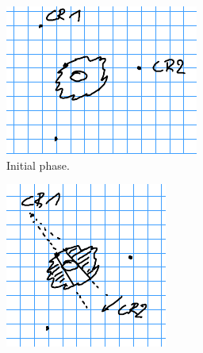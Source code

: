\begin{figure}[h!]
	\centering
	\begin{subfigure}[t]{0.3\linewidth}
		\centering
		\includegraphics[width=\linewidth]{graphics/triangle_1.png}
		\caption{Initial phase.}
		\label{fig:triangle_1}
	\end{subfigure}
	\hfill
	\begin{subfigure}[t]{0.3\linewidth}
		\centering
		\includegraphics[width=\linewidth]{graphics/triangle_2.png}

\end{subfigure}
\end{figure}
